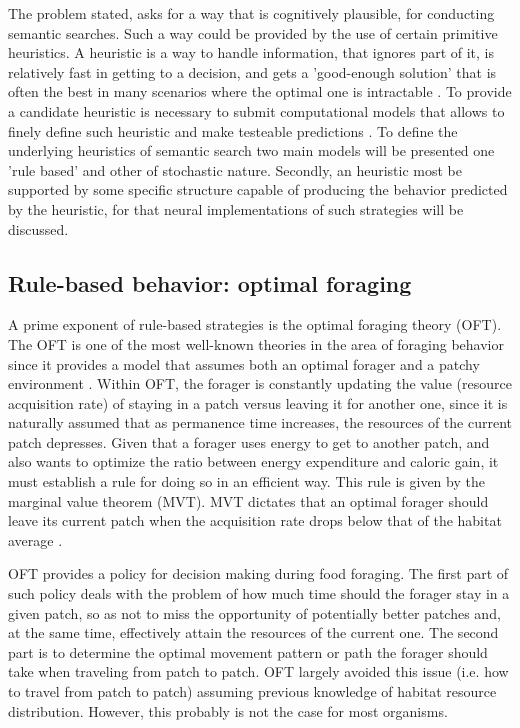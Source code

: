 \documentclass[11pt]{article}
\begin{document}
The problem stated, asks for a way that is cognitively plausible, for conducting
semantic searches. Such a way could be provided by the use of certain primitive
heuristics. A heuristic is a way to handle information, that ignores part of it,
is relatively fast in getting to a decision, and gets a 'good-enough solution'
that is often the best in many scenarios where the optimal one is intractable
\citep{gigerenzerWhyHeuristicsWork2008a}. To provide a candidate heuristic is
necessary to submit computational models that allows to finely define such
heuristic and make testeable predictions \citep{gigerenzerWhyHeuristicsWork2008a}.
To define the underlying heuristics of semantic search two main models will be
presented one 'rule based' and other of stochastic nature. Secondly, an
heuristic most be supported by some specific structure capable of producing the
behavior predicted by the heuristic, for that neural implementations of such
strategies will be discussed. 

\subsection{Rule-based behavior: optimal foraging}
\label{sec:org1b2d586}

A prime exponent of rule-based strategies is the optimal foraging theory (OFT).
The OFT is one of the most well-known theories in the area of foraging behavior
since it provides a model that assumes both an optimal forager and a patchy
environment \citep{bartumeusOptimalSearchBehavior2009a}. Within OFT, the forager
is constantly updating the value (resource acquisition rate) of staying in a
patch versus leaving it for another one, since it is naturally assumed that as
permanence time increases, the resources of the current patch depresses. Given
that a forager uses energy to get to another patch, and also wants to optimize
the ratio between energy expenditure and caloric gain, it must establish a rule
for doing so in an efficient way. This rule is given by the marginal value
theorem (MVT). MVT dictates that an optimal forager should leave its current
patch when the acquisition rate drops below that of the habitat average
\citep{charnovOptimalForagingMarginal1976a}.

OFT provides a policy for decision making during food foraging. The first part
of such policy deals with the problem of how much time should the forager stay
in a given patch, so as not to miss the opportunity of potentially better
patches and, at the same time, effectively attain the resources of the current
one. The second part is to determine the optimal movement pattern or path the
forager should take when traveling from patch to patch. OFT largely avoided this
issue (i.e. how to travel from patch to patch) assuming previous knowledge of
habitat resource distribution. However, this probably is not the case for most
organisms.
\end{document}
